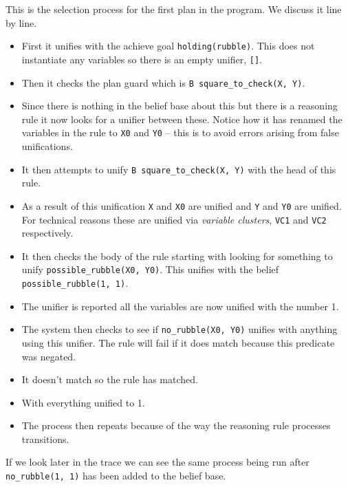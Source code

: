 This is the selection process for the first plan in the program.  We discuss it line by line.
\begin{itemize}
\item First it unifies with the achieve goal \texttt{holding(rubble)}.  This does not instantiate any variables so there is an empty unifier, \texttt{[]}.  
\item Then it checks the plan guard which is \lstinline{B square_to_check(X, Y)}.  
\item Since there is nothing in the belief base about this but there is a reasoning rule it now looks for a  unifier between these.  Notice how it has renamed the variables in the rule to \texttt{X0} and \texttt{Y0} -- this is to avoid errors arising from false unifications.  
\item It then attempts to unify \lstinline{B square_to_check(X, Y)} with the head of this rule.
\item As a result of this unification \texttt{X} and \texttt{X0} are unified and \texttt{Y} and \texttt{Y0} are unified.  For technical reasons these are unified via \emph{variable clusters}, \texttt{VC1} and \texttt{VC2} respectively.
\item It then checks the body of the rule starting with looking for something to unify \texttt{possible\_rubble(X0, Y0)}.  This unifies with the belief \texttt{possible\_rubble(1, 1)}.
\item The unifier is reported all the variables are now unified with the number 1.
\item The system then checks to see if \texttt{no\_rubble(X0, Y0)} unifies with anything using this unifier.  The rule will fail if it does match because this predicate was negated.
\item It doesn't match so the rule has matched.
\item With everything unified to 1.
\item The process then repeats because of the way the reasoning rule processes transitions.
\end{itemize}

If we look later in the trace we can see the same process being run after \texttt{no\_rubble(1, 1)} has been added to the belief base.

